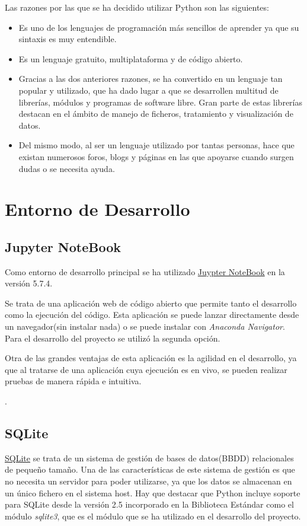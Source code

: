 Las razones por las que se ha decidido utilizar Python son las siguientes:
\begin{itemize}
	\item Es uno de los lenguajes de programación más sencillos de aprender ya que su sintaxis es muy entendible.
	\item Es un lenguaje gratuito, multiplataforma y de código abierto.
	\item Gracias a las dos anteriores razones, se ha convertido en un lenguaje tan popular y utilizado, que ha dado lugar a que se desarrollen multitud de librerías, módulos y programas de software libre. Gran parte de estas librerías destacan en el ámbito de manejo de ficheros, tratamiento y visualización de datos.
	\item Del mismo modo, al ser un lenguaje utilizado por tantas personas, hace que existan numerosos foros, blogs y páginas en las que apoyarse cuando surgen dudas o se necesita ayuda.
\end{itemize}


\section{Entorno de Desarrollo}\label{entorno_de_desarrollo}
\subsection{Jupyter NoteBook}\label{jupyter_noteBook}
Como entorno de desarrollo principal se ha utilizado \href{https://jupyter.org/}{Juypter NoteBook} en la versión 5.7.4.

Se trata de una aplicación web de código abierto que permite tanto el desarrollo como la ejecución del código.
Esta aplicación se puede lanzar directamente desde un navegador(sin instalar nada) o se puede instalar con \emph{Anaconda Navigator}. Para el desarrollo del proyecto se utilizó la segunda opción.

Otra de las grandes ventajas de esta aplicación es la agilidad en el desarrollo, ya que al tratarse de una aplicación cuya ejecución es en vivo, se pueden realizar pruebas de manera rápida e intuitiva. 

\cite{jupyter}.

\subsection{SQLite}\label{sqlite}
\href{https://www.sqlite.org/index.html}{SQLite} se trata de un sistema de gestión de bases de datos(BBDD) relacionales de pequeño tamaño.
Una de las características de este sistema de gestión es que no necesita un servidor para poder utilizarse, ya que los datos se almacenan en un único fichero en el sistema host. 
Hay que destacar que Python incluye soporte para SQLite desde la versión 2.5 incorporado en la Biblioteca Estándar como el módulo \emph{sqlite3}, que es el módulo que se ha utilizado en el desarrollo del proyecto.

